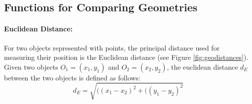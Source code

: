 \begin{figure}[ht!b]
\end{figure}

\subsection{Functions for Comparing Geometries}
\paragraph{Euclidean Distance:}
For two objects represented with points, the principal distance used  for measuring their position is the Euclidean distance (see Figure \ref{fig:geodistances}). Given two objects $O_{1} = (x_{1}, y_{1})$ and $O_{2} = (x_{2}, y_{2})$, the euclidean distance $d_{E}$ between the two objects is defined as follows:
\begin{equation}
d_{E} = \sqrt{((x_{1} - x_{2})^2 + ((y_{1} - y_{2})^2}
\end{equation}

